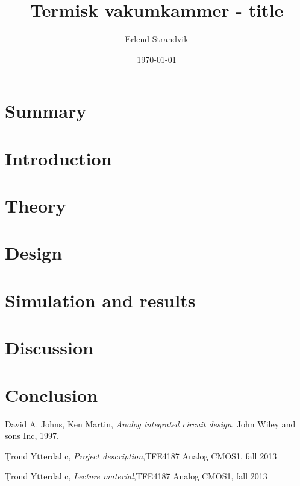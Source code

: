 \documentclass[12pt, a4paper, english]{article}
\title{Termisk vakumkammer - title}
\date{\today}
\author{Erlend Strandvik}
\numberwithin{equation}{section}
\numberwithin{figure}{section}
\numberwithin{table}{section}
\begin{document}




\section*{Summary}
%
\paragraph{}
\newpage

\tableofcontents
\listoffigures
\newpage
\setcounter{page}{1}

\section{Introduction}
%
\newpage


\section{Theory}
%



\newpage

\section{Design}
%




\newpage

\section{Simulation and results}
%

\newpage

\section{Discussion}
%
\newpage

\section{Conclusion}
%
\newpage

\begin{thebibliography}{9}

 \label{boka}
  David A. Johns, Ken Martin,
  \emph{Analog integrated circuit design}.
  John Wiley and sons Inc,  
  1997.

 \label{description}
	\c Trond Ytterdal c, \emph{Project description},TFE4187 Analog CMOS1, fall 2013

 \label{foiler}
	\c Trond Ytterdal c, \emph{Lecture material},TFE4187 Analog CMOS1, fall 2013


\end{thebibliography}
\clearpage{}



\begin{appendix}

\newpage


\end{appendix}
\end{document}
